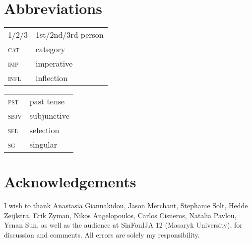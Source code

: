 \documentclass[output=paper]{langscibook}
\begin{document}
\section*{Abbreviations}

\begin{tabularx}{.5\textwidth}{@{}lX@{}}
\textsc{1/2/3}&1st/2nd/3rd person\\
\textsc{cat}&category\\
\textsc{imp}&imperative\\
\textsc{infl}&inflection\\
\end{tabularx}%
\begin{tabularx}{.5\textwidth}{@{}lX@{}}
\textsc{pst}&{past tense}\\
\textsc{sbjv}&subjunctive\\
\textsc{sel}&selection\\
\textsc{sg}&singular\\
\end{tabularx}


\section*{Acknowledgements}

I wish to thank Anastasia Giannakidou, Jason Merchant, Stephanie Solt, Hedde Zeijlstra, Erik Zyman, Nikos Angelopoulos, Carlos Cisneros, Natalia Pavlou, Ye\-nan Sun, as well as the audience at SinFonIJA 12 (Masaryk University), for discussion and comments. All errors are solely my responsibility.

{\sloppy\printbibliography[heading=subbibliography,notkeyword=this]}
\end{document}
